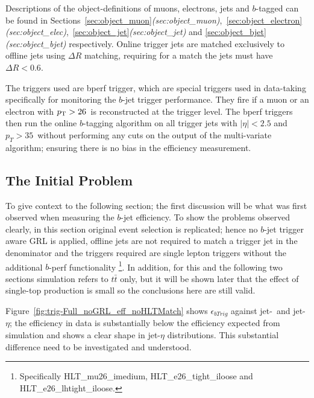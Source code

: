 Descriptions of the object-definitions of muons, electrons, jets and $b$-tagged can be found in
Sections~\ref{sec:object_muon}\textit{(sec:object\_muon)},~\ref{sec:object_electron}\textit{(sec:object\_elec)},~\ref{sec:object_jet}\textit{(sec:object\_jet)}
and \ref{sec:object_bjet}\textit{(sec:object\_bjet)} respectively.
Online trigger jets are matched exclusively to offline jets using $\Delta R$ matching, requiring for a match the jets must have $\Delta R<0.6$.

The triggers used are bperf trigger, which are special triggers used in data-taking specifically for monitoring the $b$-jet trigger performance.
They fire if a muon or an electron with $p_{\mathrm{T}} > 26$~\GeV is reconstructed at the trigger level.
The bperf triggers then run the online $b$-tagging algorithm on all trigger jets with $|\eta|<2.5$ and
$p_{T}>35$~\GeV without performing any cuts on the output of the multi-variate algorithm; ensuring there is no bias in the efficiency measurement. 


\newpage

\subsection{The Initial Problem}
\label{sec:trig-initProb}

To give context to the following section;
the first discussion will be what was first observed when measuring the $b$-jet efficiency.
To show the problems observed clearly, in this section original event selection is replicated;
hence  no $b$-jet trigger aware GRL is applied, offline jets are not required to match a trigger jet in the denominator
and the triggers required are single lepton triggers without the additional $b$-perf functionality
\footnote{Specifically HLT\_mu26\_imedium, HLT\_e26\_tight\_iloose and HLT\_e26\_lhtight\_iloose. }.
In addition, for this and the following two sections simulation refers to $t\bar{t}$ only,
but it will be shown later that the effect of single-top production is small so the conclusions here are still valid. 

Figure~\ref{fig:trig-Full_noGRL_eff_noHLTMatch} shows $\epsilon_{bTrig}$ against jet-\pT~and jet-$\eta$;
the efficiency in data is substantially below the efficiency expected from simulation and shows a clear shape in jet-$\eta$ distributions.
This substantial difference need to be investigated and understood. 

